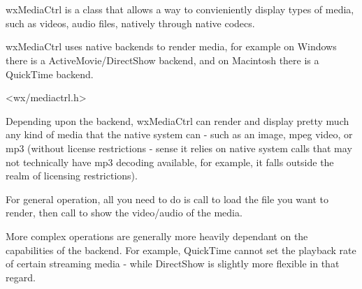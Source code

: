 
\section{}\label{wxmediactrl}

wxMediaCtrl is a class that allows a way to convieniently display types of 
media, such as videos, audio files, natively through native codecs.

wxMediaCtrl uses native backends to render media, for example on Windows
there is a ActiveMovie/DirectShow backend, and on Macintosh there is a 
QuickTime backend.




<wx/mediactrl.h>


\label{renderingmediawxmediactrl}

Depending upon the backend, wxMediaCtrl can render
and display pretty much any kind of media that the native system can - 
such as an image, mpeg video, or mp3 (without license restrictions -
sense it relies on native system calls that may not technically
have mp3 decoding available, for example, it falls outside the
realm of licensing restrictions).

For general operation, all you need to do is call 
 to load the file
you want to render, then call  
to show the video/audio of the media.

More complex operations are generally more heavily dependant on the
capabilities of the backend.  For example, QuickTime cannot set
the playback rate of certain streaming media - while DirectShow is 
slightly more flexible in that regard.

\label{operationwxmediactrl}

